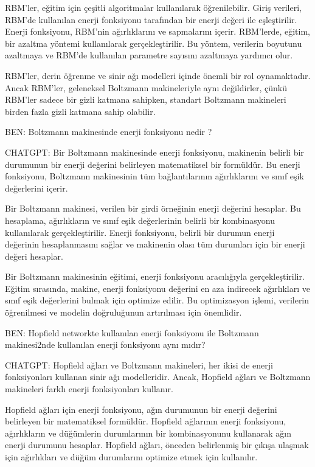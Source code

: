 \documentclass[11pt]{article}
\begin{document}
RBM'ler, eğitim için çeşitli algoritmalar kullanılarak öğrenilebilir. Giriş verileri, RBM'de kullanılan enerji fonksiyonu tarafından bir enerji değeri ile eşleştirilir. Enerji fonksiyonu, RBM'nin ağırlıklarını ve sapmalarını içerir. RBM'lerde, eğitim, bir azaltma yöntemi kullanılarak gerçekleştirilir. Bu yöntem, verilerin boyutunu azaltmaya ve RBM'de kullanılan parametre sayısını azaltmaya yardımcı olur.

RBM'ler, derin öğrenme ve sinir ağı modelleri içinde önemli bir rol oynamaktadır. Ancak RBM'ler, geleneksel Boltzmann makineleriyle aynı değildirler, çünkü RBM'ler sadece bir gizli katmana sahipken, standart Boltzmann makineleri birden fazla gizli katmana sahip olabilir.

BEN: Boltzmann makinesinde enerji fonksiyonu nedir ?

CHATGPT: Bir Boltzmann makinesinde enerji fonksiyonu, makinenin belirli bir durumunun bir enerji değerini belirleyen matematiksel bir formüldür. Bu enerji fonksiyonu, Boltzmann makinesinin tüm bağlantılarının ağırlıklarını ve sınıf eşik değerlerini içerir.

Bir Boltzmann makinesi, verilen bir girdi örneğinin enerji değerini hesaplar. Bu hesaplama, ağırlıkların ve sınıf eşik değerlerinin belirli bir kombinasyonu kullanılarak gerçekleştirilir. Enerji fonksiyonu, belirli bir durumun enerji değerinin hesaplanmasını sağlar ve makinenin olası tüm durumları için bir enerji değeri hesaplar.

Bir Boltzmann makinesinin eğitimi, enerji fonksiyonu aracılığıyla gerçekleştirilir. Eğitim sırasında, makine, enerji fonksiyonu değerini en aza indirecek ağırlıkları ve sınıf eşik değerlerini bulmak için optimize edilir. Bu optimizasyon işlemi, verilerin öğrenilmesi ve modelin doğruluğunun artırılması için önemlidir.

BEN: Hopfield networkte kullanılan enerji fonksiyonu ile Boltzmann makinesi2nde kullanılan enerji fonksiyonu aynı mıdır?

CHATGPT: Hopfield ağları ve Boltzmann makineleri, her ikisi de enerji fonksiyonları kullanan sinir ağı modelleridir. Ancak, Hopfield ağları ve Boltzmann makineleri farklı enerji fonksiyonları kullanır.

Hopfield ağları için enerji fonksiyonu, ağın durumunun bir enerji değerini belirleyen bir matematiksel formüldür. Hopfield ağlarının enerji fonksiyonu, ağırlıkların ve düğümlerin durumlarının bir kombinasyonunu kullanarak ağın enerji durumunu hesaplar. Hopfield ağları, önceden belirlenmiş bir çıkışa ulaşmak için ağırlıkları ve düğüm durumlarını optimize etmek için kullanılır.
\end{document}
